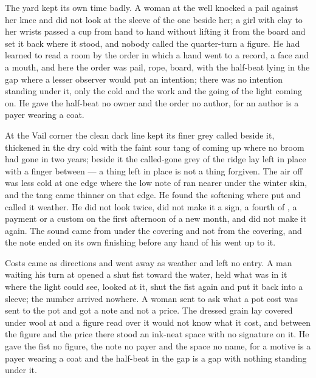 The yard kept its own time badly. A woman at the well knocked a pail against her knee and did not look at the sleeve of the one beside her; a girl with clay to her wrists passed a cup from hand to hand without lifting it from the board and set it back where it stood, and nobody called the quarter-turn a figure. He had learned to read a room by the order in which a hand went to a record, a face and a mouth, and here the order was pail, rope, board, with the half-beat lying in the gap where a lesser observer would put an intention; there was no intention standing under it, only the cold and the work and the going of the light coming on. He gave the half-beat no owner and the order no author, for an author is a payer wearing a coat.

At the Vail corner the clean dark line kept its finer grey called  beside it, thickened in the dry cold with the faint sour tang of  coming up where no broom had gone in two years; beside it the called-gone grey of the ridge lay left in place with a finger between --- a thing left in place is not a thing forgiven. The air off  was less cold at one edge where the low note of  ran nearer under the winter skin, and the tang came thinner on that edge. He found the softening where put and called it weather. He did not look twice, did not make it a sign, a fourth of , a payment or a custom on the first afternoon of a new month, and did not make it again. The sound came from under the covering and not from the covering, and the note ended on its own finishing before any hand of his went up to it.

Costs came as directions and went away as weather and left no entry. A man waiting his turn at  opened a shut fist toward the water, held what was in it where the light could see, looked at it, shut the fist again and put it back into a sleeve; the number arrived nowhere. A woman sent to ask what a pot cost was sent to the pot and got a note and not a price. The dressed grain lay covered under wool at  and a figure read over it would not know what it cost, and between the figure and the price there stood an ink-neat space with no signature on it. He gave the fist no figure, the note no payer and the space no name, for a motive is a payer wearing a coat and the half-beat in the gap is a gap with nothing standing under it.

